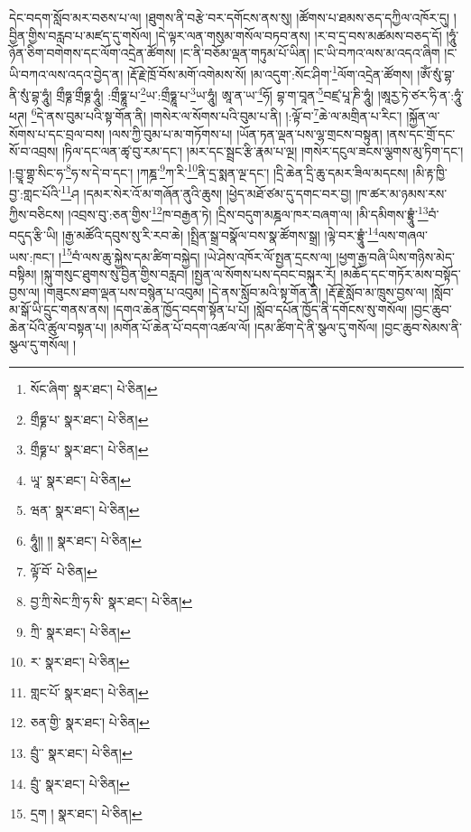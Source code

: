 དེང་བདག་སློབ་མར་བཅས་པ་ལ། །ཐུགས་ནི་བརྩེ་བར་དགོངས་ནས་སུ། །ཚོགས་པ་ཐམས་ཅད་དཀྱིལ་འཁོར་དུ། །བྱིན་གྱིས་བརླབ་པ་མཛད་དུ་གསོལ། །དེ་ལྟར་ལན་གསུམ་གསོལ་བཏབ་ནས། །ར་བ་དྲ་བས་མཚམས་བཅད་དོ། །ཧཱུཾ་ཉོན་ཅིག་བགེགས་དང་ལོག་འདྲེན་ཚོགས། །ང་ནི་བཅོམ་ལྡན་གཏུམ་པོ་ཡིན། །ང་ཡི་བཀའ་ལས་མ་འདའ་ཞིག །ང་ཡི་བཀའ་ལས་འདའ་བྱེད་ན། །རྡོ་རྗེ་ཁྲོ་བོས་མགོ་འགེམས་སོ། །མ་འདུག་:སོང་ཤིག་\footnote{སོང་ཞིག་  སྣར་ཐང་།  པེ་ཅིན། }ལོག་འདྲེན་ཚོགས། །ཨོཾ་སུཾ་བྷ་ནི་སུཾ་བྷ་ཧཱུཾ། གྲྀཧྞ་གྲྀཧྞ་ཧཱུཾ། :གྲྀཧྞཱ་པ་\footnote{གྲྀཧྞ་པ་  སྣར་ཐང་།  པེ་ཅིན། }ཡ་:གྲྀཧྞཱ་པ་\footnote{གྲྀཧྞ་པ་  སྣར་ཐང་།  པེ་ཅིན། }ཡ་ཧཱུཾ། ཨཱ་ན་ཡ་\footnote{ཡཱ་  སྣར་ཐང་།  པེ་ཅིན། }ཧོ། བྷ་ག་བཱན་\footnote{ཝན་  སྣར་ཐང་།  པེ་ཅིན། }བཛྲ་པཱ་ཎི་ཧཱུཾ། །ཨཱརྱ་ཏེ་ཙར་ཧི་ན་:ཧཱུཾ་ཕཊ། \footnote{ཧཱུཾ།། །།   སྣར་ཐང་།  པེ་ཅིན། }དེ་ནས་བུམ་པའི་སྟ་གོན་ནི། །གསེར་ལ་སོགས་པའི་བུམ་པ་ནི། །:ལྟོ་བ་\footnote{ལྟོ་བོ་  པེ་ཅིན། }ཆེ་ལ་མགྲིན་པ་རིང་། །སྐྱོན་ལ་སོགས་པ་དང་བྲལ་བས། །ལས་ཀྱི་བུམ་པ་མ་གཏོགས་པ། །ཡོན་ཏན་ལྡན་པས་ལྷ་གྲངས་བསྟུན། །ནས་དང་གྲོ་དང་སོ་བ་འབྲས། །ཏིལ་དང་ལན་ཚྭ་བུ་རམ་དང་། །མར་དང་སྦྲང་རྩི་རྣམ་པ་ལྔ། །གསེར་དངུལ་ཟངས་ལྕགས་མུ་ཏིག་དང་། །:བྱཱ་གྷྲ་སིང་ཧ་\footnote{བྱ་ཀྲི་སེང་ཀྲི་ཧ་སི་  སྣར་ཐང་།  པེ་ཅིན། }ཧ་ས་དེ་བ་དང་། །ཀཎྜ་\footnote{ཀྲི་  སྣར་ཐང་།  པེ་ཅིན། }ཀ་རི་\footnote{ར་  སྣར་ཐང་།  པེ་ཅིན། }ནི་དྲ་སྨན་ལྔ་དང་། །དྲི་ཆེན་དྲི་ཆུ་དམར་ཟིལ་མདངས། །མི་རྟ་ཁྱི་བྱ་:གླང་པོའི་\footnote{གླང་པོ་  སྣར་ཐང་།  པེ་ཅིན། }ཤ །དམར་སེར་འོ་མ་གཞོན་ནུའི་ཆུས། །ཕྱེད་མཐོ་ཙམ་དུ་དགང་བར་བྱ། །ཁ་ཚར་མ་ཉམས་རས་ཀྱིས་བཅིངས། །འབྲས་བུ་:ཅན་གྱིས་\footnote{ཅན་གྱི་  སྣར་ཐང་།  པེ་ཅིན། }ཁ་བརྒྱན་ཏེ། །དྲིས་བདུག་མཎྜལ་ཁར་བཞག་ལ། །མི་དམིགས་བྷྲཱུཾ་\footnote{བྲུཾ་་  སྣར་ཐང་།  པེ་ཅིན། }བཾ་བདུད་རྩི་ཡི། །རྒྱ་མཚོའི་དབུས་སུ་རི་རབ་ཆེ། །སྤྲིན་སྒྲ་བསྣོལ་བས་སྣ་ཚོགས་སྒྲ། །ལྟེ་བར་བྷྲཱུཾ་\footnote{བྲུཾ་  སྣར་ཐང་།  པེ་ཅིན། }ལས་གཞལ་ཡས་:ཁང་། །\footnote{དྲག །  སྣར་ཐང་།  པེ་ཅིན། }བཾ་ལས་ཆུ་སྐྱེས་དམ་ཚིག་བསྐྱེད། །ཡེ་ཤེས་འཁོར་ལོ་སྤྱན་དྲངས་ལ། །ཕྱག་རྒྱ་བཞི་ཡིས་གཉིས་མེད་བསྟིམ། །སྐུ་གསུང་ཐུགས་སུ་བྱིན་གྱིས་བརླབ། །སྤྱན་ལ་སོགས་པས་དབང་བསྐུར་རོ། །མཆོད་དང་གཏོར་མས་བསྟོད་བྱས་ལ། །གཟུངས་ཐག་ལྡན་པས་བསྙེན་པ་འབུམ། །དེ་ནས་སློབ་མའི་སྟ་གོན་ནི། །རྡོ་རྗེ་སློབ་མ་ཁྲུས་བྱས་ལ། །སློབ་མ་སྒོ་ཡི་དྲུང་གནས་ནས། །དགའ་ཆེན་ཁྱོད་བདག་སྟོན་པ་པོ། །སློབ་དཔོན་ཁྱོད་ནི་དགོངས་སུ་གསོལ། །བྱང་ཆུབ་ཆེན་པོའི་ཚུལ་བསྟན་པ། །མགོན་པོ་ཆེན་པོ་བདག་འཚལ་ལོ། །དམ་ཚིག་དེ་ནི་སྩལ་དུ་གསོལ། །བྱང་ཆུབ་སེམས་ནི་སྩལ་དུ་གསོལ། །
